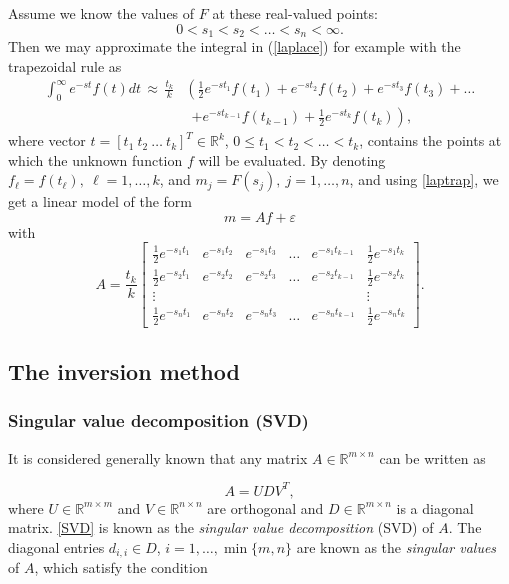 \documentclass[12pt,a4]{article}
\newcommand{\R}{{\mathbb R}}
\begin{document}
Assume we know the values of $F$ at these real-valued points:
$$
 0<s_1<s_2<\ldots <s_n<\infty.
$$ 
Then we may approximate the integral in (\ref{laplace}) for example with the trapezoidal rule as
\begin{equation} \label{laptrap}
\begin{split}
 \int_0^\infty e^{-st}f(t)dt\, \approx\, \frac{t_k}{k} & \left( \frac{1}{2}e^{-st_1}f(t_1)+e^{-st_2}f(t_2)+e^{-st_3}f(t_3)+\ldots\right.\\   &\ \ \left. +e^{-st_{k-1}}f(t_{k-1})+\frac{1}{2}e^{-st_k}f(t_k)\right) ,
\end{split}
\end{equation}
where vector $t=[t_1\ t_2\ \ldots\ t_k]^T\in\R^k$, $0\leq t_1<t_2<\ldots <t_k$, contains the points at which the unknown function $f$ will be evaluated. By denoting $f_\ell=f(t_\ell), \ \ell=1,\ldots ,k$, and $m_j=F(s_j),\ j=1,\ldots ,n$, and using \eqref{laptrap}, we get a linear model of the form 
\begin{equation}\label{linearModel}
m=Af+\varepsilon
\end{equation}
with
\begin{equation}\label{LaplaceA} 
A = \frac{t_k}{k}\begin{bmatrix} \frac{1}{2}e^{-s_1t_1} & e^{-s_1t_2} & e^{-s_1t_3} & \ldots & e^{-s_1t_{k-1}} & \frac{1}{2}e^{-s_1t_k} \\
                       \frac{1}{2}e^{-s_2t_1} & e^{-s_2t_2} & e^{-s_2t_3} & \ldots & e^{-s_2t_{k-1}} & \frac{1}{2}e^{-s_2t_k} \\
                       \vdots & & & & & \vdots \\
                       \frac{1}{2}e^{-s_nt_1} & e^{-s_nt_2} & e^{-s_nt_3} & \ldots & e^{-s_nt_{k-1}} & \frac{1}{2}e^{-s_nt_k} \end{bmatrix}.
\end{equation}


\subsection{The inversion method}


\subsubsection{Singular value decomposition (SVD)}\label{sec:SVDsec}
It is considered generally known that any matrix  $A \in \R^{m \times n}$ can be written as

\begin{equation}\label{SVD}
A = UDV^T,
\end{equation}
where $U \in \R^{m \times m}$ and $V \in \R^{n \times n}$ are orthogonal and $D \in \R^{m \times n}$ is a diagonal matrix. \eqref{SVD} is known as the \emph{singular value decomposition} (SVD) of $A$. The diagonal entries $d_{i,i} \in D$, $i = 1, \ldots ,\min\{m,n\}$ are known as the \emph{singular values} of $A$, which satisfy the condition
\end{document}
